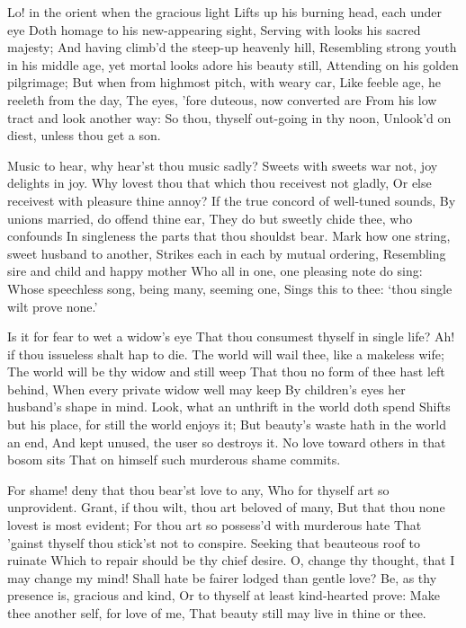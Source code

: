 \documentclass[twocolumn]{book}
\begin{document}
Lo! in the orient when the gracious light
Lifts up his burning head, each under eye
Doth homage to his new-appearing sight,
Serving with looks his sacred majesty;
And having climb'd the steep-up heavenly hill,
Resembling strong youth in his middle age,
yet mortal looks adore his beauty still,
Attending on his golden pilgrimage;
But when from highmost pitch, with weary car,
Like feeble age, he reeleth from the day,
The eyes, 'fore duteous, now converted are
From his low tract and look another way:
  So thou, thyself out-going in thy noon,
  Unlook'd on diest, unless thou get a son.


Music to hear, why hear'st thou music sadly?
Sweets with sweets war not, joy delights in joy.
Why lovest thou that which thou receivest not gladly,
Or else receivest with pleasure thine annoy?
If the true concord of well-tuned sounds,
By unions married, do offend thine ear,
They do but sweetly chide thee, who confounds
In singleness the parts that thou shouldst bear.
Mark how one string, sweet husband to another,
Strikes each in each by mutual ordering,
Resembling sire and child and happy mother
Who all in one, one pleasing note do sing:
  Whose speechless song, being many, seeming one,
  Sings this to thee: `thou single wilt prove none.'


Is it for fear to wet a widow's eye
That thou consumest thyself in single life?
Ah! if thou issueless shalt hap to die.
The world will wail thee, like a makeless wife;
\numerus*{}The world will be thy widow and still weep
That thou no form of thee hast left behind,
When every private widow well may keep
By children's eyes her husband's shape in mind.
Look, what an unthrift in the world doth spend
Shifts but his place, for still the world enjoys it;
But beauty's waste hath in the world an end,
And kept unused, the user so destroys it.
  No love toward others in that bosom sits
  That on himself such murderous shame commits.


For shame! deny that thou bear'st love to any,
Who for thyself art so unprovident.
Grant, if thou wilt, thou art beloved of many,
But that thou none lovest is most evident;
For thou art so possess'd with murderous hate
That 'gainst thyself thou stick'st not to conspire.
Seeking that beauteous roof to ruinate
Which to repair should be thy chief desire.
O, change thy thought, that I may change my mind!
\numerus*{}Shall hate be fairer lodged than gentle love?
Be, as thy presence is, gracious and kind,
Or to thyself at least kind-hearted prove:
  Make thee another self, for love of me,
  That beauty still may live in thine or thee.
\end{document}
